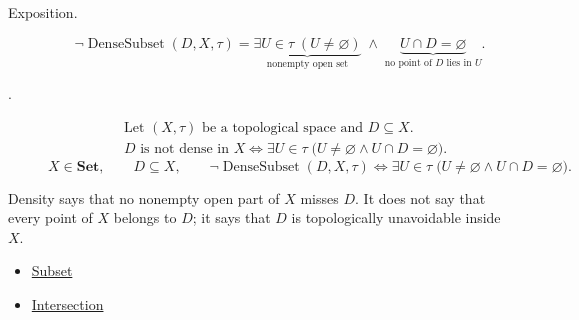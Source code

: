 \begin{remark*}
\begin{description}
\item[Exposition.]
\[
\neg\operatorname{DenseSubset}(D,X,\tau)
=
\underbrace{\exists U\in\tau\;(U\neq\varnothing)}_{\text{nonempty open set}}
\;\land\;
\underbrace{U\cap D=\varnothing}_{\text{no point of }D\text{ lies in }U}.
\]


  \item[.]
  \[
\begin{aligned}
&\text{Let }(X,\tau)\text{ be a topological space and }D\subseteq X.\\
&D\text{ is not dense in }X
\Longleftrightarrow
\exists U\in\tau\;\bigl(U\neq\varnothing\land U\cap D=\varnothing\bigr).
\end{aligned}
\]
\[
X\in\mathbf{Set},\qquad D\subseteq X,\qquad
\neg\operatorname{DenseSubset}(D,X,\tau)\Longleftrightarrow
\exists U\in\tau\;\bigl(U\neq\varnothing\land U\cap D=\varnothing\bigr).
\]
\end{description}
\end{remark*}

\begin{remark*}[Interpretation]
Density says that no nonempty open part of $X$ misses $D$.  It does not
say that every point of $X$ belongs to $D$; it says that $D$ is
topologically unavoidable inside $X$.
\end{remark*}

\begin{dependencies}
\begin{itemize}
  \item \hyperref[def:subset]{Subset}
  \item \hyperref[def:intersection]{Intersection}
\end{itemize}
\end{dependencies}

